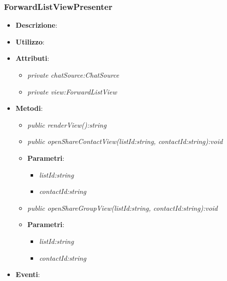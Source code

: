 \subsubsection{ForwardListViewPresenter}
\begin{itemize}
\item \textbf{Descrizione}: 
\item \textbf{Utilizzo}:
\item \textbf{Attributi}: 
	\begin{itemize}
	\item \textit{private chatSource:ChatSource}\\
	
	\item \textit{private view:ForwardListView}\\
	
	\end{itemize}
\item \textbf{Metodi}:
	\begin{itemize}	
	\item \textit{public renderView():string}\\

	\item \textit{public openShareContactView(listId:string, contactId:string):void}\\
	
			\item{\textbf{Parametri}: \begin{itemize}
			\item \textit{listId:string}\\
			
			\item \textit{contactId:string}\\
	
			\end{itemize}}
	\item \textit{public openShareGroupView(listId:string, contactId:string):void}\\

			\item{\textbf{Parametri}: \begin{itemize}
			\item \textit{listId:string}\\
			
			\item \textit{contactId:string}\\

			\end{itemize}}
	\end{itemize}
\item \textbf{Eventi}:
\end{itemize}

